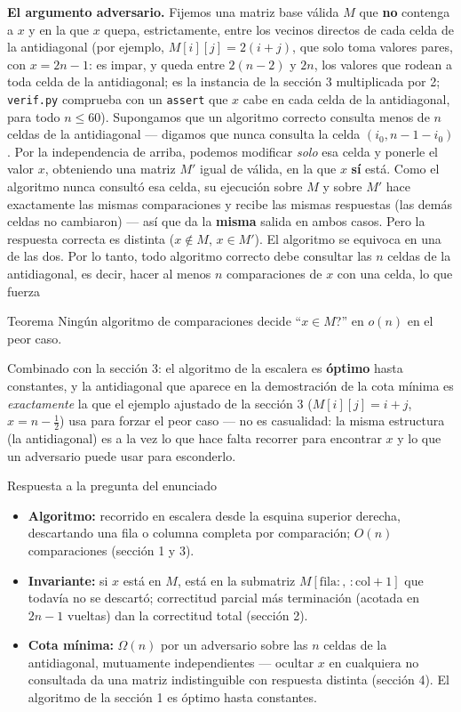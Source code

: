 \documentclass[11pt]{article}
\begin{document}
\textbf{El argumento adversario.} Fijemos una matriz base válida $M$ que \textbf{no} contenga a $x$ y en la que
$x$ quepa, estrictamente, entre los vecinos directos de cada celda de la antidiagonal (por ejemplo,
$M[i][j]=2(i+j)$, que solo toma valores pares, con $x=2n-1$: es impar, y queda entre $2(n-2)$ y $2n$, los
valores que rodean a toda celda de la antidiagonal; es la instancia de la sección 3 multiplicada por 2; \texttt{verif.py} comprueba con un \texttt{assert}
que $x$ cabe en cada celda de la antidiagonal, para todo $n\le 60$). Supongamos que un
algoritmo correcto consulta menos de $n$ celdas de la antidiagonal --- digamos que nunca consulta la celda
$(i_0,n{-}1{-}i_0)$. Por la independencia de arriba, podemos modificar \emph{solo} esa celda y ponerle el
valor $x$, obteniendo una matriz $M'$ igual de válida, en la que $x$ \textbf{sí} está. Como el algoritmo
nunca consultó esa celda, su ejecución sobre $M$ y sobre $M'$ hace exactamente las mismas comparaciones y
recibe las mismas respuestas (las demás celdas no cambiaron) --- así que da la \textbf{misma} salida en
ambos casos. Pero la respuesta correcta es distinta ($x\notin M$, $x\in M'$). El algoritmo se equivoca en
una de las dos. Por lo tanto, todo algoritmo correcto debe consultar las $n$ celdas de la antidiagonal, es decir, hacer al
menos $n$ comparaciones de $x$ con una celda, lo que fuerza

\begin{resultado}{Teorema}
Ningún algoritmo de comparaciones decide ``$x\in M$?'' en $o(n)$ en el peor caso.
\end{resultado}

Combinado con la sección 3: el algoritmo de la escalera es \textbf{óptimo} hasta constantes, y la antidiagonal
que aparece en la demostración de la cota mínima es \emph{exactamente} la que el ejemplo ajustado de la
sección 3 ($M[i][j]=i+j$, $x=n{-}\tfrac12$) usa para forzar el peor caso --- no es casualidad: la misma
estructura (la antidiagonal) es a la vez lo que hace falta recorrer para encontrar $x$ y lo que un
adversario puede usar para esconderlo.

\begin{resultado}{Respuesta a la pregunta del enunciado}
\begin{itemize}[leftmargin=14pt]
\item \textbf{Algoritmo:} recorrido en escalera desde la esquina superior derecha, descartando una fila o
columna completa por comparación; $O(n)$ comparaciones (sección 1 y 3).
\item \textbf{Invariante:} si $x$ está en $M$, está en la submatriz $M[\mathrm{fila}:,\,:\mathrm{col}{+}1]$
que todavía no se descartó; correctitud parcial más terminación (acotada en $2n-1$ vueltas) dan la
correctitud total (sección 2).
\item \textbf{Cota mínima:} $\Omega(n)$ por un adversario sobre las $n$ celdas de la antidiagonal, mutuamente
independientes --- ocultar $x$ en cualquiera no consultada da una matriz indistinguible con respuesta
distinta (sección 4). El algoritmo de la sección 1 es óptimo hasta constantes.
\end{itemize}
\end{resultado}
\end{document}
